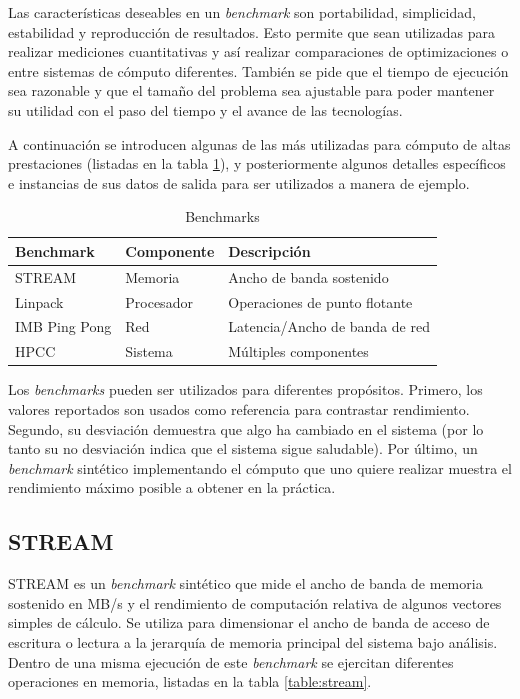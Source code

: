 \documentclass[a4paper]{report}
\begin{document}
\bigskip

Las características deseables en un {\it benchmark} son portabilidad, simplicidad, estabilidad y
reproducción de resultados. Esto permite que sean utilizadas para realizar
mediciones cuantitativas y así realizar comparaciones de optimizaciones o
entre sistemas de cómputo diferentes. También se pide que el tiempo de
ejecución sea razonable y que el tamaño del problema sea ajustable para
poder mantener su utilidad con el paso del tiempo y el avance de las
tecnologías.

\bigskip

A continuación se introducen algunas de las más utilizadas para cómputo
de altas prestaciones (listadas en la tabla \ref{table:benchmark-list}),
y posteriormente algunos detalles específicos e instancias
de sus datos de salida para ser utilizados a manera de ejemplo.

\begin{table}[H]
    \caption{Benchmarks}
    \centering
    \begin{tabular}{|l|l|l|}\hline
      {\bf Benchmark} & {\bf Componente} & {\bf Descripción} \\ \hline
      STREAM & Memoria & Ancho de banda sostenido \\ \hline
      Linpack & Procesador & Operaciones de punto flotante \\ \hline
      IMB Ping Pong & Red & Latencia/Ancho de banda de red \\ \hline
      HPCC & Sistema & Múltiples componentes \\ \hline
        \end{tabular}
  \label{table:benchmark-list}
\end{table}

\bigskip

Los {\it benchmarks} pueden ser utilizados para diferentes propósitos. Primero,
los valores reportados son usados como referencia para contrastar rendimiento.
Segundo, su desviación demuestra que algo ha cambiado en el sistema (por lo tanto
su no desviación indica que el sistema sigue saludable). Por último,
un {\it benchmark} sintético implementando el cómputo que uno quiere realizar
muestra el rendimiento máximo posible a obtener en la práctica.

\subsection{STREAM}

STREAM \cite{stream} es un {\it benchmark} sintético que mide el ancho de banda de memoria sostenido en MB/s y el rendimiento de computación relativa de algunos vectores simples de cálculo. Se utiliza para dimensionar el ancho de banda de acceso de escritura o lectura a la jerarquía de memoria principal del sistema bajo análisis. Dentro de una misma ejecución de este {\it benchmark} se ejercitan diferentes operaciones en memoria, listadas en la tabla \ref{table:stream}.
\end{document}
